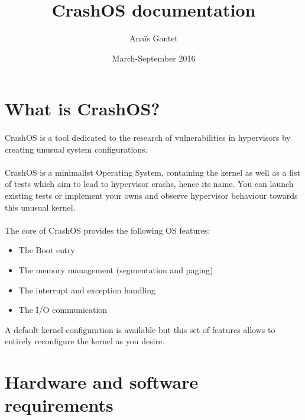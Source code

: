 \documentclass[12pt, openany]{report}
\begin{document}
\title{CrashOS documentation}
\author{Anaïs Gantet}
\date{March-September 2016}
\maketitle
\tableofcontents

\newpage
\section*{What is CrashOS?}
\paragraph{}CrashOS is a tool dedicated to the research of vulnerabilities in hypervisors by creating unusual system configurations. 
\paragraph{}CrashOS is a minimalist Operating System, containing the kernel as well as a list of tests which aim to lead to hypervisor crashs, hence its name. You can launch existing tests or implement your owns and observe hypervisor behaviour towards this unusual kernel.

\paragraph{}The core of CrashOS provides the following OS features: 
\begin{itemize}
	\item The Boot entry
	\item The memory management (segmentation and paging)
	\item The interrupt and exception handling
	\item The I/O communication
\end{itemize}
A default kernel configuration is available but this set of features allows to entirely reconfigure the kernel as you desire.

\section*{Hardware and software requirements}
\end{document}
